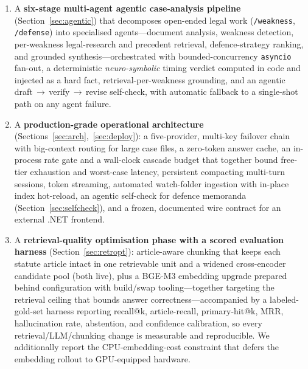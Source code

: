 \documentclass[final,1p,times]{elsarticle}
\begin{document}
\begin{enumerate}
        prompts, paired with a \emph{grounding-safe} few-shot exemplar that
        raises reasoning coverage without reintroducing hallucinated citations.
  \item A \textbf{six-stage multi-agent agentic case-analysis pipeline}
        (Section~\ref{sec:agentic}) that decomposes open-ended legal work
        (\texttt{/weakness}, \texttt{/defense}) into specialised agents---document
        analysis, weakness detection, per-weakness legal-research and precedent
        retrieval, defence-strategy ranking, and grounded synthesis---orchestrated
        with bounded-concurrency \texttt{asyncio} fan-out, a deterministic
        \emph{neuro-symbolic} timing verdict computed in code and injected as a
        hard fact, retrieval-per-weakness grounding, and an agentic
        draft\,$\rightarrow$\,verify\,$\rightarrow$\,revise self-check, with automatic
        fallback to a single-shot path on any agent failure.
  \item A \textbf{production-grade operational architecture}
        (Sections~\ref{sec:arch},~\ref{sec:deploy}): a five-provider, multi-key
        failover chain with big-context routing for large case files, a
        zero-token answer cache, an in-process rate gate and a wall-clock
        cascade budget that together bound free-tier exhaustion and worst-case
        latency, persistent compacting multi-turn sessions, token streaming,
        automated watch-folder ingestion with in-place index hot-reload, an
        agentic self-check for defence memoranda
        (Section~\ref{sec:selfcheck}), and a frozen, documented wire contract
        for an external .NET frontend.
  \item A \textbf{retrieval-quality optimisation phase with a scored evaluation
        harness} (Section~\ref{sec:retropt}): article-aware chunking that keeps
        each statute article intact in one retrievable unit and a widened
        cross-encoder candidate pool (both live), plus a BGE-M3 embedding upgrade
        prepared behind configuration with build/swap tooling---together targeting
        the retrieval ceiling that bounds answer correctness---accompanied by a
        labeled-gold-set harness reporting recall@k, article-recall, primary-hit@k,
        MRR, hallucination rate, abstention, and confidence calibration, so every
        retrieval/LLM/chunking change is measurable and reproducible. We
        additionally report the CPU-embedding-cost constraint that defers the
        embedding rollout to GPU-equipped hardware.
\end{enumerate}
\end{document}
